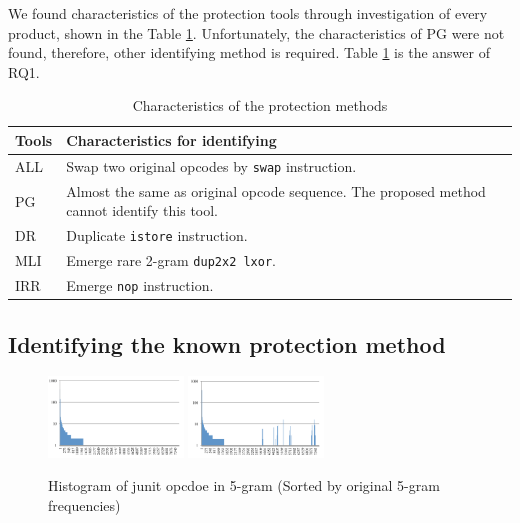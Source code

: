\documentclass[conference]{IEEEtran}
\begin{document}
We found characteristics of the protection tools through investigation
of every product, shown in the Table \ref{table:characteristics}.
Unfortunately, the characteristics of PG were not found, therefore, other
identifying method is required.  Table \ref{table:characteristics} is
the answer of RQ1.

\begin{table}[t]
  \centering
  \footnotesize{
    \caption{Characteristics of the protection methods}\label{table:characteristics}
  \begin{tabular}{l|p{6.5cm}}
    \textbf{Tools} & \textbf{Characteristics for identifying} \\ \hline
    ALL  & Swap two original opcodes by \texttt{swap} instruction. \\
    PG   & Almost the same as original opcode sequence.  The proposed method cannot identify this tool. \\
    DR   & Duplicate \texttt{istore} instruction. \\
    MLI  & Emerge rare 2-gram \texttt{dup2x2 lxor}. \\
    IRR  & Emerge \texttt{nop} instruction. \\
  \end{tabular}}
\end{table}

\subsection{Identifying the known protection method}\label{sect:rq2-1}

\begin{figure}[bt]
  \centering
  \includegraphics[width=0.32\textwidth]{images/ORI_junit}%
  \label{fig:junit-5gram-original-histogram}%
  \includegraphics[width=0.32\textwidth]{images/MLI_junit}%
  \label{fig:junit-5gram-MLI-histogram}%
  \caption{Histogram of junit opcdoe in 5-gram (Sorted by original 5-gram frequencies)}
  \label{fig:junit-5gram-histogram}
\end{figure}
  
\end{document}
